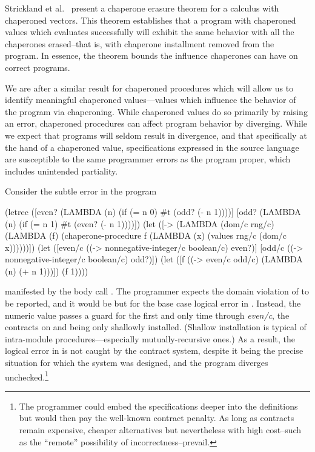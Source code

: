 Strickland et al.~\cite{strickland2012chaperones} present a chaperone erasure theorem for a calculus with chaperoned vectors.
This theorem establishes that a program with chaperoned values which evaluates successfully will exhibit the same behavior with all the chaperones erased--that is, with chaperone installment removed from the program.
In essence, the theorem bounds the influence chaperones can have on correct programs.

We are after a similar result for chaperoned procedures which will allow us to identify meaningful chaperoned values---values which influence the behavior of the program via chaperoning.
While chaperoned values do so primarily by raising an error, chaperoned procedures can affect program behavior by diverging.
While we expect that programs will seldom result in divergence, and that specifically at the hand of a chaperoned value, specifications expressed in the source language are susceptible to the same programmer errors as the program proper, which includes unintended partiality.

Consider the subtle error in the program
\begin{schemedisplay}
(letrec ([even? (LAMBDA (n)
                (if (= n 0)
                      #t
                      (odd? (- n 1))))]
         [odd? (LAMBDA (n)
                 (if (= n 1)
                     #t
                     (even? (- n 1))))])
  (let ([-> (LAMBDA (dom/c rng/c)
              (LAMBDA (f) (chaperone-procedure
                           f
                           (LAMBDA (x) (values rng/c (dom/c x))))))])
    (let ([even/c ((-> nonnegative-integer/c boolean/c) even?)]
          [odd/c  ((-> nonnegative-integer/c boolean/c) odd?)])
      (let ([f ((-> even/c odd/c) (LAMBDA (n) (+ n 1)))])
        (f 1))))
\end{schemedisplay}
manifested by the body call .
The programmer expects the domain violation of  to be reported, and it would be but for the base case logical error in .
Instead, the numeric value passes a guard for the first and only time through \emph{even/c}, the contracts on  and  being only shallowly installed.
(Shallow installation is typical of intra-module procedures---especially mutually-recursive ones.)
As a result, the logical error in  is not caught by the contract system, despite it being the precise situation for which the system was designed, and the program diverges unchecked.\footnote{The programmer could embed the specifications deeper into the definitions but would then pay the well-known contract penalty.
As long as contracts remain expensive, cheaper alternatives but nevertheless with high cost--such as the ``remote'' possibility of incorrectness--prevail.}

